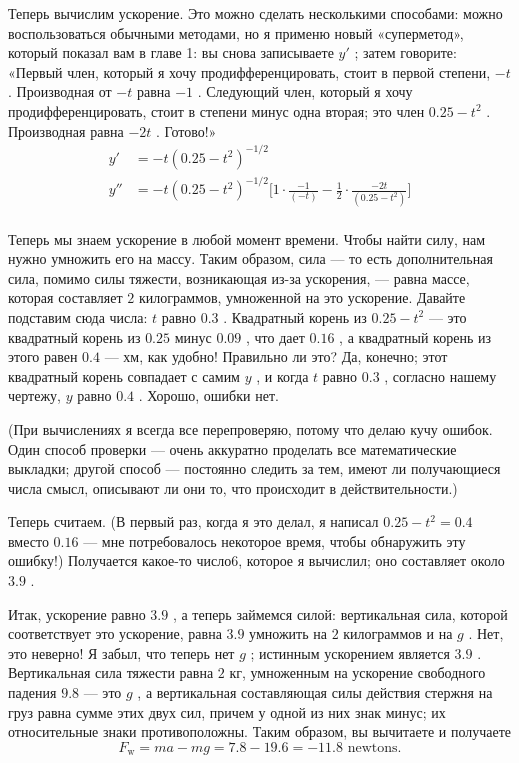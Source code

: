 \documentclass[11pt,oneside]{article}
\begin{document}
Теперь вычислим ускорение. Это можно сделать несколькими способами: можно воспользоваться обычными методами, но я применю новый «суперметод», который показал вам в главе 1: вы снова записываете \(y'\) ; затем говорите: «Первый член, который я хочу продифференцировать, стоит в первой степени, \(-t\) . Производная от \(-t\) равна \(-1\) . Следующий член, который я хочу продифференцировать, стоит в степени минус одна вторая; это член \(0.25-t^2\) . Производная равна \(-2t\) . Готово!» 
\begin{equation*} \begin{aligned} y' &= -t(0.25-t^2)^{-1/2}\\[1ex] y'' &= -t(0.25-t^2)^{-1/2}\bigg[1\cdot\frac{-1}{(-t)}-\frac12\cdot\frac{-2t}{(0.25-t^2)}\bigg]\\ \end{aligned} \tag{2.19}
\label{Eq:TIPS:2:19} \end{equation*}
\par

Теперь мы знаем ускорение в любой момент времени. Чтобы найти силу, нам нужно умножить его на массу. Таким образом, сила --- то есть дополнительная сила, помимо силы тяжести, возникающая из-за ускорения, --- равна массе, которая составляет \(2\) килограммов, умноженной на это ускорение. Давайте подставим сюда числа: \(t\) равно \(0.3\) . Квадратный корень из \(0.25-t^2\) --- это квадратный корень из \(0.25\) минус \(0.09\) , что дает \(0.16\) , а квадратный корень из этого равен \(0.4\) --- хм, как удобно! Правильно ли это? Да, конечно; этот квадратный корень совпадает с самим \(y\) , и когда \(t\) равно \(0.3\) , согласно нашему чертежу, \(y\) равно \(0.4\) . Хорошо, ошибки нет.\par

(При вычислениях я всегда все перепроверяю, потому что делаю кучу ошибок. Один способ проверки --- очень аккуратно проделать все математические выкладки; другой способ --- постоянно следить за тем, имеют ли получающиеся числа смысл, описывают ли они то, что происходит в действительности.)\par

Теперь считаем. (В первый раз, когда я это делал, я написал \(0.25-t^2 = 0.4\) вместо \(0.16\) --- мне потребовалось некоторое время, чтобы обнаружить эту ошибку!) Получается какое-то число6, которое я вычислил; оно составляет около \(3.9\) .\par

Итак, ускорение равно \(3.9\) , а теперь займемся силой: вертикальная сила, которой соответствует это ускорение, равна \(3.9\) умножить на \(2\) килограммов и на \(g\) . Нет, это неверно! Я забыл, что теперь нет \(g\) ; истинным ускорением является \(3.9\) . Вертикальная сила тяжести равна \(2\) кг, умноженным на ускорение свободного падения \(9.8\) --- это \(g\) , а вертикальная составляющая силы действия стержня на груз равна сумме этих двух сил, причем у одной из них знак минус; их относительные знаки противоположны. Таким образом, вы вычитаете и получаете 
\begin{equation*} \tag{2.20}
\label{Eq:TIPS:2:20} F_\text{w} = ma-mg = 7.8-19.6 = -11.8 \text{ newtons.} \end{equation*}
\par
\end{document}

